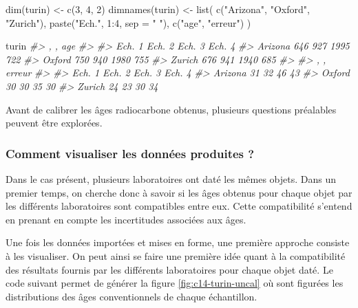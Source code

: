 \documentclass[
  french,
]{scrbook}
\newenvironment{Shaded}{\begin{snugshade}}{\end{snugshade}}
\newcommand{\AttributeTok}[1]{\textcolor[rgb]{0.77,0.63,0.00}{#1}}
\newcommand{\CommentTok}[1]{\textcolor[rgb]{0.56,0.35,0.01}{\textit{#1}}}
\newcommand{\DecValTok}[1]{\textcolor[rgb]{0.00,0.00,0.81}{#1}}
\newcommand{\FunctionTok}[1]{\textcolor[rgb]{0.00,0.00,0.00}{#1}}
\newcommand{\NormalTok}[1]{#1}
\newcommand{\OtherTok}[1]{\textcolor[rgb]{0.56,0.35,0.01}{#1}}
\newcommand{\SpecialCharTok}[1]{\textcolor[rgb]{0.00,0.00,0.00}{#1}}
\newcommand{\StringTok}[1]{\textcolor[rgb]{0.31,0.60,0.02}{#1}}
\begin{document}
\begin{Shaded}
\begin{Highlighting}[]
\FunctionTok{dim}\NormalTok{(turin) }\OtherTok{\textless{}{-}} \FunctionTok{c}\NormalTok{(}\DecValTok{3}\NormalTok{, }\DecValTok{4}\NormalTok{, }\DecValTok{2}\NormalTok{)}
\FunctionTok{dimnames}\NormalTok{(turin) }\OtherTok{\textless{}{-}} \FunctionTok{list}\NormalTok{(}
  \FunctionTok{c}\NormalTok{(}\StringTok{"Arizona"}\NormalTok{, }\StringTok{"Oxford"}\NormalTok{, }\StringTok{"Zurich"}\NormalTok{),}
  \FunctionTok{paste}\NormalTok{(}\StringTok{"Ech."}\NormalTok{, }\DecValTok{1}\SpecialCharTok{:}\DecValTok{4}\NormalTok{, }\AttributeTok{sep =} \StringTok{" "}\NormalTok{),}
  \FunctionTok{c}\NormalTok{(}\StringTok{"age"}\NormalTok{, }\StringTok{"erreur"}\NormalTok{)}
\NormalTok{)}

\NormalTok{turin}
\CommentTok{\#\textgreater{} , , age}
\CommentTok{\#\textgreater{} }
\CommentTok{\#\textgreater{}         Ech. 1 Ech. 2 Ech. 3 Ech. 4}
\CommentTok{\#\textgreater{} Arizona    646    927   1995    722}
\CommentTok{\#\textgreater{} Oxford     750    940   1980    755}
\CommentTok{\#\textgreater{} Zurich     676    941   1940    685}
\CommentTok{\#\textgreater{} }
\CommentTok{\#\textgreater{} , , erreur}
\CommentTok{\#\textgreater{} }
\CommentTok{\#\textgreater{}         Ech. 1 Ech. 2 Ech. 3 Ech. 4}
\CommentTok{\#\textgreater{} Arizona     31     32     46     43}
\CommentTok{\#\textgreater{} Oxford      30     30     35     30}
\CommentTok{\#\textgreater{} Zurich      24     23     30     34}
\end{Highlighting}
\end{Shaded}

Avant de calibrer les âges radiocarbone obtenus, plusieurs questions préalables peuvent être explorées.

\hypertarget{comment-visualiser-les-donnuxe9es-produites}{%
\subsubsection{Comment visualiser les données produites ?}\label{comment-visualiser-les-donnuxe9es-produites}}

Dans le cas présent, plusieurs laboratoires ont daté les mêmes objets. Dans un premier temps, on cherche donc à savoir si les âges obtenus pour chaque objet par les différents laboratoires sont compatibles entre eux. Cette compatibilité s'entend en prenant en compte les incertitudes associées aux âges.

Une fois les données importées et mises en forme, une première approche consiste à les visualiser. On peut ainsi se faire une première idée quant à la compatibilité des résultats fournis par les différents laboratoires pour chaque objet daté. Le code suivant permet de générer la figure \ref{fig:c14-turin-uncal} où sont figurées les distributions des âges conventionnels de chaque échantillon.
\end{document}
